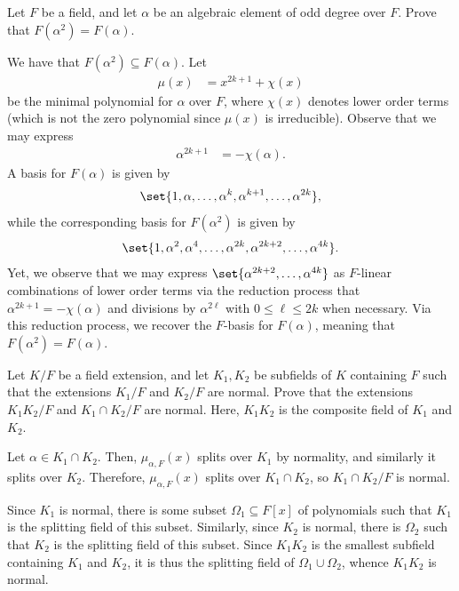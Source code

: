 \documentclass[10pt]{mypackage}
\begin{document}
\begin{problem}[Problem 5]
  Let $F$ be a field, and let $\alpha$ be an algebraic element of odd degree over $F$. Prove that $F\left( \alpha^2 \right) = F\left( \alpha \right)$.
\end{problem}
\begin{solution}
  We have that $F\left( \alpha^2 \right)\subseteq F\left( \alpha \right)$. Let
  \begin{align*}
    \mu(x) &= x^{2k+1} + \chi(x)
  \end{align*}
  be the minimal polynomial for $\alpha$ over $F$, where $\chi(x)$ denotes lower order terms (which is not the zero polynomial since $\mu(x)$ is irreducible). Observe that we may express
  \begin{align*}
    \alpha^{2k+1} &= -\chi\left(\alpha\right).
  \end{align*}
  A basis for $F\left( \alpha \right)$ is given by
  \begin{align*}
    \set{1,\alpha,\dots,\alpha^{k},\alpha^{k+1},\dots,\alpha^{2k}},
  \end{align*}
  while the corresponding basis for $F\left( \alpha^2 \right)$ is given by
  \begin{align*}
    \set{1,\alpha^{2},\alpha^{4},\dots,\alpha^{2k},\alpha^{2k+2},\dots,\alpha^{4k}}.
  \end{align*}
  Yet, we observe that we may express $\set{\alpha^{2k+2},\dots,\alpha^{4k}}$ as $F$-linear combinations of lower order terms via the reduction process that $\alpha^{2k+1} = -\chi\left( \alpha \right)$ and divisions by $\alpha^{2\ell}$ with $0\leq \ell \leq 2k$ when necessary. Via this reduction process, we recover the $F$-basis for $F\left( \alpha \right)$, meaning that $F\left( \alpha^2 \right) = F\left( \alpha \right)$.
\end{solution}
\begin{problem}[Problem 8]
  Let $K/F$ be a field extension, and let $K_1,K_2$ be subfields of $K$ containing $F$ such that the extensions $K_1/F$ and $K_2/F$ are normal. Prove that the extensions $K_1K_2/F$ and $K_1\cap K_2/F$ are normal. Here, $K_1K_2$ is the composite field of $K_1$ and $K_2$.
\end{problem}
\begin{solution}
  Let $\alpha\in K_1\cap K_2$. Then, $\mu_{\alpha,F}(x)$ splits over $K_1$ by normality, and similarly it splits over $K_2$. Therefore, $\mu_{\alpha,F}(x)$ splits over $K_1\cap K_2$, so $K_1\cap K_2/F$ is normal.

  Since $K_1$ is normal, there is some subset $\Omega_1\subseteq F[x]$ of polynomials such that $K_1$ is the splitting field of this subset. Similarly, since $K_2$ is normal, there is $\Omega_2$ such that $K_2$ is the splitting field of this subset. Since $K_1K_2$ is the smallest subfield containing $K_1$ and $K_2$, it is thus the splitting field of $\Omega_1\cup \Omega_2$, whence $K_1K_2$ is normal.
\end{solution}
\end{document}
